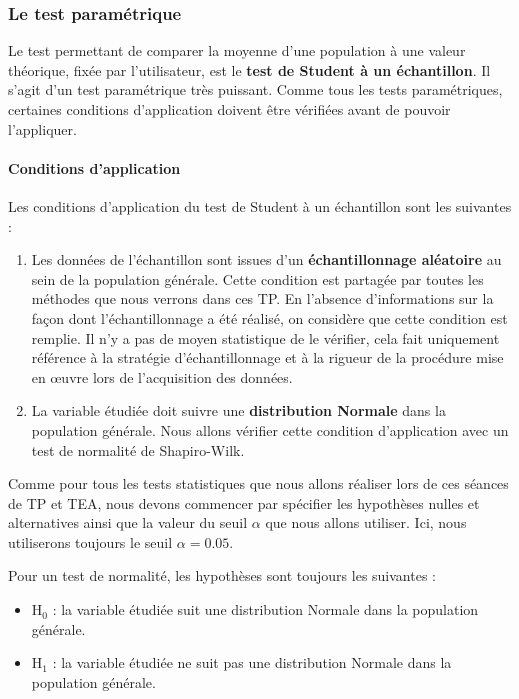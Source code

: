 \documentclass[a4paperpaper,]{article}
\providecommand{\tightlist}{%
  \setlength{\itemsep}{0pt}\setlength{\parskip}{0pt}}
\let\oldparagraph\paragraph
\renewcommand{\paragraph}[1]{\oldparagraph{#1}\mbox{}}
\begin{document}
\hypertarget{le-test-paramuxe9trique}{%
\subsubsection{Le test paramétrique}\label{le-test-paramuxe9trique}}

Le test permettant de comparer la moyenne d'une population à une valeur théorique, fixée par l'utilisateur, est le \textbf{test de Student à un échantillon}. Il s'agit d'un test paramétrique très puissant. Comme tous les tests paramétriques, certaines conditions d'application doivent être vérifiées avant de pouvoir l'appliquer.

\hypertarget{conditions-dapplication}{%
\paragraph{Conditions d'application}\label{conditions-dapplication}}

Les conditions d'application du test de Student à un échantillon sont les suivantes :

\begin{enumerate}
\def\labelenumi{\arabic{enumi}.}
\tightlist
\item
  Les données de l'échantillon sont issues d'un \textbf{échantillonnage aléatoire} au sein de la population générale. Cette condition est partagée par toutes les méthodes que nous verrons dans ces TP. En l'absence d'informations sur la façon dont l'échantillonnage a été réalisé, on considère que cette condition est remplie. Il n'y a pas de moyen statistique de le vérifier, cela fait uniquement référence à la stratégie d'échantillonnage et à la rigueur de la procédure mise en œuvre lors de l'acquisition des données.
\item
  La variable étudiée doit suivre une \textbf{distribution Normale} dans la population générale. Nous allons vérifier cette condition d'application avec un test de normalité de Shapiro-Wilk.
\end{enumerate}

Comme pour tous les tests statistiques que nous allons réaliser lors de ces séances de TP et TEA, nous devons commencer par spécifier les hypothèses nulles et alternatives ainsi que la valeur du seuil \(\alpha\) que nous allons utiliser. Ici, nous utiliserons toujours le seuil \(\alpha = 0.05\).

Pour un test de normalité, les hypothèses sont toujours les suivantes :

\begin{itemize}
\tightlist
\item
  H\(_0\) : la variable étudiée suit une distribution Normale dans la population générale.
\item
  H\(_1\) : la variable étudiée ne suit pas une distribution Normale dans la population générale.
\end{itemize}
\end{document}
